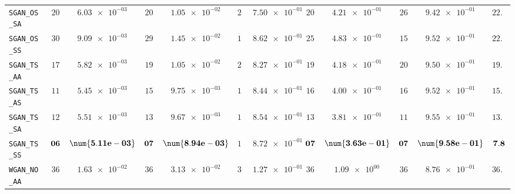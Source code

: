 \begin{xltabular}{\textwidth}{l||cC|cC|cC|cC|cC||c}
	\texttt{SGAN\_OS\_SA} & $ 20$ & $ \num{6.03e-03}$ & $ 20$ & $ \num{1.05e-02}$ & $ 24$ & $ \num{7.50e-01}$ & $ 20$ & $ \num{4.21e-01}$ & $ 26$ & $ \num{9.42e-01}$ & $ 22.0$  \\
	\texttt{SGAN\_OS\_SS} & $ 30$ & $ \num{9.09e-03}$ & $ 29$ & $ \num{1.45e-02}$ & $ 15$ & $ \num{8.62e-01}$ & $ 25$ & $ \num{4.83e-01}$ & $ 15$ & $ \num{9.52e-01}$ & $ 22.8$  \\
	\texttt{SGAN\_TS\_AA} & $ 17$ & $ \num{5.82e-03}$ & $ 19$ & $ \num{1.05e-02}$ & $ 22$ & $ \num{8.27e-01}$ & $ 19$ & $ \num{4.18e-01}$ & $ 20$ & $ \num{9.50e-01}$ & $ 19.4$  \\
	\texttt{SGAN\_TS\_AS} & $ 11$ & $ \num{5.45e-03}$ & $ 15$ & $ \num{9.75e-03}$ & $ 18$ & $ \num{8.44e-01}$ & $ 16$ & $ \num{4.00e-01}$ & $ 16$ & $ \num{9.52e-01}$ & $ 15.2$  \\
	\texttt{SGAN\_TS\_SA} & $ 12$ & $ \num{5.51e-03}$ & $ 13$ & $ \num{9.67e-03}$ & $ 16$ & $ \num{8.54e-01}$ & $ 13$ & $ \num{3.81e-01}$ & $ 11$ & $ \num{9.55e-01}$ & $ 13.0$  \\
	\texttt{SGAN\_TS\_SS} & $\bf 06$ & $\bf \num{5.11e-03}$ & $\bf 07$ & $\bf \num{8.94e-03}$ & $ 12$ & $ \num{8.72e-01}$ & $\bf 07$ & $\bf \num{3.63e-01}$ & $\bf 07$ & $\bf \num{9.58e-01}$ & $\bf 7.8$  \\ \hline
	\texttt{WGAN\_NO\_AA} & $ 36$ & $ \num{1.63e-02}$ & $ 36$ & $ \num{3.13e-02}$ & $ 36$ & $ \num{1.27e-01}$ & $ 36$ & $ \num{1.09e+00}$ & $ 36$ & $ \num{8.76e-01}$ & $ 36.0$  \\

\end{xltabular}
